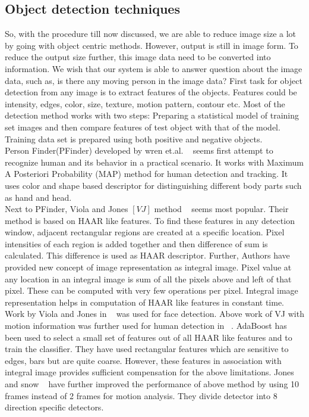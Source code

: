 \subsection{Object detection techniques}
\indent So, with the procedure till now discussed, we are able to reduce
image size a lot by going with object centric methods. However, output
is still in image form. To reduce the output size further, this image
data need to be converted into information. We wish that our system is
able to answer question about the image data, such as, is there any
moving person in the image data? First task for object detection from
any image is to extract features of the objects. Features could be
intensity, edges, color, size, texture, motion pattern, contour etc.
Most of the detection method works with two steps: Preparing a
statistical model of training set images and then compare features of
test object with that of the model.  Training data set is prepared using
both positive and negative objects.\\

\indent Person Finder(PFinder) developed by wren et.al. ~\cite{12} seems
first attempt to recognize human and its behavior in a practical
scenario. It works with Maximum A Posteriori Probability (MAP) method
for human detection and tracking. It uses color and shape based
descriptor for distinguishing different body parts such as hand and
head.\\

\indent Next to PFinder, Viola and Jones $[VJ]$ method ~\cite{16, 17}
seems most popular. Their method is based on HAAR like features. To find
these features in any detection window, adjacent rectangular regions are
created at a specific location. Pixel intensities of each region is
added together and then difference of sum is calculated. This difference
is used as HAAR descriptor. Further, Authors have provided new concept
of image representation as integral image.  Pixel value at any location
in an integral image is sum of all the pixels above and left of that
pixel.  These can be computed with very few operations per pixel.
Integral image representation helps in computation of HAAR like features
in constant time.\\

\indent Work by Viola and Jones in ~\cite{17} was used for face
detection.  Above work of VJ with motion information was further used
for human detection in ~\cite{16}.  AdaBoost has been used to select a
small set of features out of all HAAR like features and to train the
classifier. They have used rectangular features which are sensitive to
edges, bars but are quite coarse. However, these features in association
with integral image provides sufficient compensation for the above
limitations. Jones and snow ~\cite{26} have further improved the
performance of above method by using 10 frames instead of 2 frames for
motion analysis. They divide detector into 8 direction specific
detectors.\\


